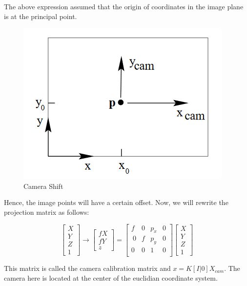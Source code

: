 The above expression assumed that the origin of coordinates in the image plane is at the principal point. 

\begin{figure}
    \centering
    \includegraphics{img/camera-shift.png}
    \caption{Camera Shift}
    \label{fig:camera-shift}
\end{figure}

Hence, the image points will have a certain offset. Now, we will rewrite the projection matrix as follows:

\begin{equation*}
    \begin{bmatrix}
    X \\
    Y \\
    Z \\
    1
    \end{bmatrix}\longrightarrow \begin{bmatrix}
    fX \\
    fY \\
    z
    \end{bmatrix} = \begin{bmatrix}
    f & 0 & p_x & 0 \\\
    0 & f & p_y & 0 \\
    0 & 0 & 1 & 0 \\
    \end{bmatrix} \begin{bmatrix}
    X \\
    Y \\
    Z \\
    1
    \end{bmatrix}
\end{equation*}

This matrix is called the camera calibration matrix and $x = K[I|0]X_{cam}$. The camera here is located at the center of the euclidian coordinate system. 

